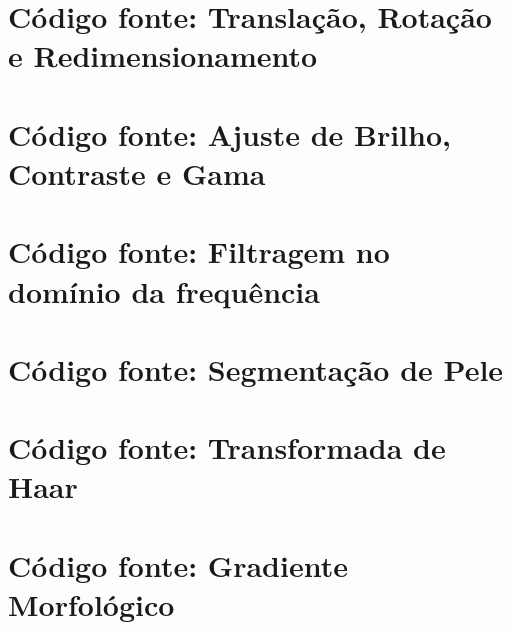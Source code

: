 \documentclass[
	article,			%
	11pt,				%
	oneside,			%
	a4paper,			%
	english,			%
	brazil,				%
	sumario=tradicional
	]{abntex2}
\newcommand{\matlabCodePath}{/home/clifte/git/Mestrado/Matlab/}
\begin{document}
\begin{apendicesenv} 

\chapter{Código fonte: Translação, Rotação e Redimensionamento}
\label{apend:transRotRed}

	
 	\lstset{extendedchars=true,inputencoding=utf8/latin1}
 	



\chapter{Código fonte: Ajuste de Brilho, Contraste e Gama}
\label{apend:contBriGama}

\lstset{extendedchars=true,inputencoding=utf8/latin1}








\chapter{Código fonte: Filtragem no domínio da frequência}
\label{apend:filtragemCod}
\lstset{extendedchars=true,inputencoding=utf8/latin1}


\chapter{Código fonte: Segmentação de Pele}
\label{apend:skinSegment}
\lstset{extendedchars=true,inputencoding=utf8/latin1}


\chapter{Código fonte: Transformada de Haar}
\label{apend:HaarCode}
\lstset{extendedchars=true,inputencoding=utf8/latin1}


\chapter{Código fonte: Gradiente Morfológico}
\label{apend:gradMorfCode}
\lstset{extendedchars=true,inputencoding=utf8/latin1}



\end{apendicesenv}
\end{document}
